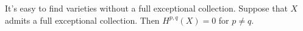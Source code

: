 

 It's easy to find varieties without a full exceptional collection. Suppose that $X$ admits a full exceptional collection. Then $H^{p, q}(X) = 0$ for $p \neq q$.

